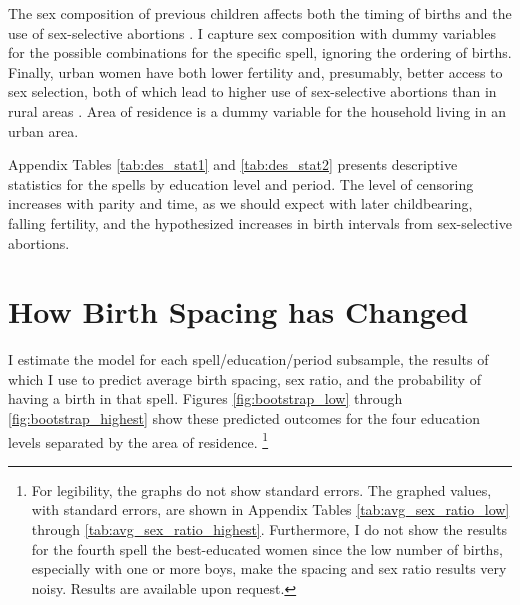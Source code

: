 \documentclass[12pt,letterpaper]{article}
\begin{document}
The sex composition of previous children affects both the timing of births and the use of 
sex-selective abortions 
\citep{retherford03b,Bhalotra2008,Portner2015b,Soest2018}.
I capture sex composition with dummy variables for the
possible combinations for the specific spell, ignoring the ordering of births.
Finally, urban women have both lower fertility and, presumably, better access to
sex selection, both of which lead to higher use of sex-selective abortions than in 
rural areas \citep{retherford03b,Portner2015b}.
Area of residence is a dummy variable for the household living in an urban area.


Appendix Tables \ref{tab:des_stat1} and \ref{tab:des_stat2} presents descriptive 
statistics for the spells by education level and period.
The level of censoring increases with parity and time, as we should expect with later 
childbearing, falling fertility, and the hypothesized increases in birth intervals from 
sex-selective abortions.



\section{How Birth Spacing has Changed\label{sec:results}}


I estimate the model for each spell/education/period subsample, the results of which I use 
to predict average birth spacing, sex ratio, and the probability of having a birth in that 
spell.
Figures \ref{fig:bootstrap_low} through \ref{fig:bootstrap_highest}
show these predicted outcomes for the four education levels separated by the area of 
residence.%
\footnote{
For legibility, the graphs do not show standard errors.
The graphed values, with standard errors, are shown in Appendix Tables 
\ref{tab:avg_sex_ratio_low} through \ref{tab:avg_sex_ratio_highest}.
Furthermore, I do not show the results for the fourth spell the best-educated women since 
the low number of births, especially with one or more boys, make the spacing and sex ratio 
results very noisy.
Results are available upon request.
}
\end{document}
